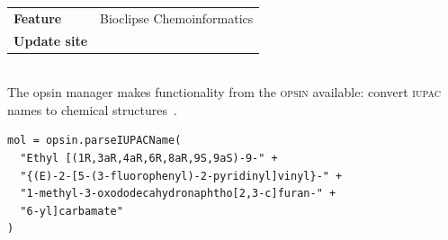 \documentclass{book}
\begin{document}
\begin{refsection}
\begin{tabular}{ll}
\textbf{Feature} & Bioclipse Chemoinformatics \\
\textbf{Update site} & \url{} \\
\end{tabular} \\

The opsin manager makes functionality from the \textsc{opsin}
available: convert \textsc{iupac} names to chemical
structures~\cite{lowe2011chemical}.

\begin{Verbatim}
mol = opsin.parseIUPACName(
  "Ethyl [(1R,3aR,4aR,6R,8aR,9S,9aS)-9-" +
  "{(E)-2-[5-(3-fluorophenyl)-2-pyridinyl]vinyl}-" +
  "1-methyl-3-oxododecahydronaphtho[2,3-c]furan-" +
  "6-yl]carbamate"
)
\end{Verbatim}

\printbibliography[heading=subbibliography]
\end{refsection}
\end{document}
